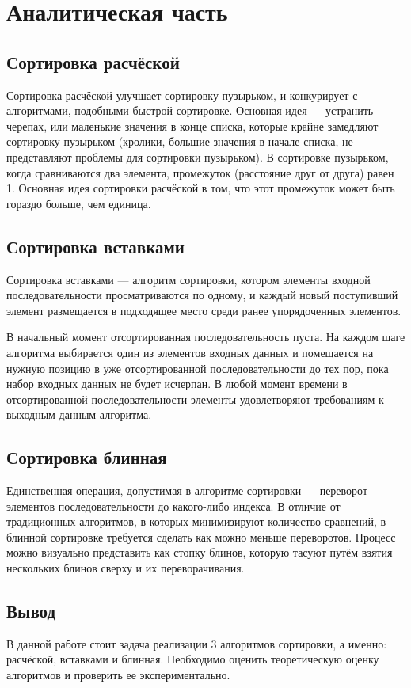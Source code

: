 \chapter{Аналитическая часть}

\section{Сортировка расчёской}

Сортировка расчёской улучшает сортировку пузырьком, и конкурирует с алгоритмами, подобными быстрой сортировке.
Основная идея — устранить черепах, или маленькие значения в конце списка, которые крайне замедляют сортировку пузырьком (кролики, большие значения в начале списка, не представляют проблемы для сортировки пузырьком).
В сортировке пузырьком, когда сравниваются два элемента, промежуток (расстояние друг от друга) равен 1. Основная идея сортировки расчёской в том, что этот промежуток может быть гораздо больше, чем единица.

\section{Сортировка вставками}

Сортировка вставками — алгоритм сортировки, котором элементы входной последовательности просматриваются по одному, и каждый новый поступивший элемент размещается в подходящее место среди ранее упорядоченных элементов.

В начальный момент отсортированная последовательность пуста.
На каждом шаге алгоритма выбирается один из элементов входных данных и помещается на нужную позицию в уже отсортированной последовательности до тех пор, пока набор входных данных не будет исчерпан.
В любой момент времени в отсортированной последовательности элементы удовлетворяют требованиям к выходным данным алгоритма.

\section{Сортировка блинная}

Единственная операция, допустимая в алгоритме сортировки — переворот элементов последовательности до какого-либо индекса.
В отличие от традиционных алгоритмов, в которых минимизируют количество сравнений, в блинной сортировке требуется сделать как можно меньше переворотов.
Процесс можно визуально представить как стопку блинов, которую тасуют путём взятия нескольких блинов сверху и их переворачивания.

\section*{Вывод}
В данной работе стоит задача реализации 3 алгоритмов сортировки, а именно: расчёской, вставками и блинная.
Необходимо оценить теоретическую оценку алгоритмов и проверить ее экспериментально.
